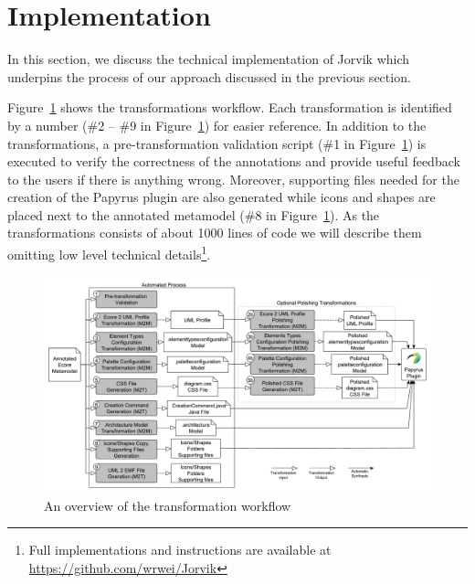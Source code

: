 \section{Implementation}
\label{sec:implementation}
In this section, we discuss the technical implementation of Jorvik which underpins the process of our approach discussed in the previous section. 

Figure~\ref{fig:transformationWorkflow} shows the transformations workflow. 
Each transformation is identified by a number (\#2 -- \#9 in Figure~\ref{fig:transformationWorkflow}) for easier reference. 
In addition to the transformations, a pre-transformation validation script (\#1 in Figure~\ref{fig:transformationWorkflow}) is executed to verify the correctness of the annotations and provide useful feedback to the users if there is anything wrong. 
Moreover, supporting files needed for the creation of the Papyrus plugin are also generated while icons and shapes are placed next to the annotated metamodel (\#8 in Figure~\ref{fig:transformationWorkflow}). 
As the transformations consists of about 1000 lines of code we will describe them omitting low level technical details\footnote{Full implementations and instructions are available at \url{https://github.com/wrwei/Jorvik}}. 

\begin{figure}[ht!]
	\centering
	\includegraphics[width=1\textwidth]{diagrams/transformationWorkflow.pdf}
	\caption[]{An overview of the transformation workflow}
	\label{fig:transformationWorkflow}
\end{figure}

